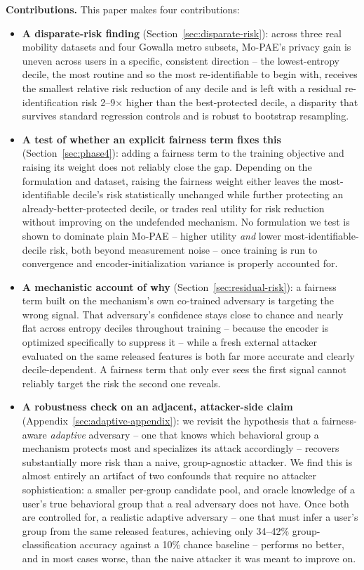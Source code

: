 \textbf{Contributions.} This paper makes four contributions:
\begin{itemize}
\item \textbf{A disparate-risk finding} (Section~\ref{sec:disparate-risk}):
  across three real mobility datasets and four Gowalla metro subsets,
  Mo-PAE's privacy gain is uneven across users in a specific, consistent
  direction -- the lowest-entropy decile, the most routine and so the
  most re-identifiable to begin with, receives the smallest relative
  risk reduction of any decile and is left with a residual
  re-identification risk 2--9$\times$ higher than the best-protected
  decile, a disparity that survives standard regression controls and is
  robust to bootstrap resampling.
\item \textbf{A test of whether an explicit fairness term fixes this}
  (Section~\ref{sec:phase4}): adding a fairness term to the training
  objective and raising its weight does not reliably close the gap.
  Depending on the formulation and dataset, raising the fairness weight
  either leaves the most-identifiable decile's risk statistically
  unchanged while further protecting an already-better-protected
  decile, or trades real utility for risk reduction without improving
  on the undefended mechanism. No formulation we test is shown to
  dominate plain Mo-PAE -- higher utility \emph{and} lower
  most-identifiable-decile risk, both beyond measurement noise -- once
  training is run to convergence and encoder-initialization variance is
  properly accounted for.
\item \textbf{A mechanistic account of why} (Section~\ref{sec:residual-risk}):
  a fairness term built on the mechanism's own co-trained adversary is
  targeting the wrong signal. That adversary's confidence stays close
  to chance and nearly flat across entropy deciles throughout training
  -- because the encoder is optimized specifically to suppress it --
  while a fresh external attacker evaluated on the same released
  features is both far more accurate and clearly decile-dependent. A
  fairness term that only ever sees the first signal cannot reliably
  target the risk the second one reveals.
\item \textbf{A robustness check on an adjacent, attacker-side claim}
  (Appendix~\ref{sec:adaptive-appendix}): we revisit the hypothesis that
  a fairness-aware \emph{adaptive} adversary -- one that knows which
  behavioral group a mechanism protects most and specializes its attack
  accordingly -- recovers substantially more risk than a naive,
  group-agnostic attacker. We find this is almost entirely an artifact
  of two confounds that require no attacker sophistication: a smaller
  per-group candidate pool, and oracle knowledge of a user's true
  behavioral group that a real adversary does not have. Once both are
  controlled for, a realistic adaptive adversary -- one that must infer
  a user's group from the same released features, achieving only
  34--42\% group-classification accuracy against a 10\% chance baseline
  -- performs no better, and in most cases worse, than the naive
  attacker it was meant to improve on.
\end{itemize}

